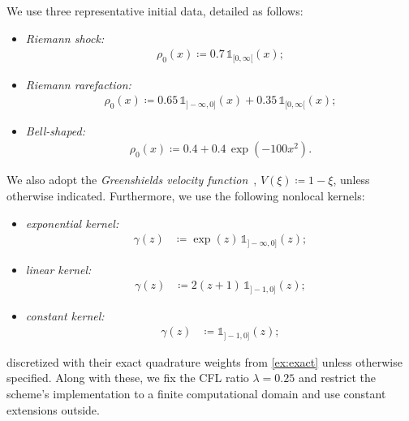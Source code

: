 \documentclass[10pt]{amsart}
\theoremstyle{plain}
\theoremstyle{definition}
\numberwithin{equation}{section}
\begin{document}
We use three representative initial data, detailed as follows:  
\begin{itemize}
    \item \emph{Riemann shock:}
    \begin{align}\label{eq:ini_riemann_shock}
        \rho_0(x) \coloneqq 0.7\,\mathds{1}_{[0,\infty[}(x);
    \end{align}
    \item \emph{Riemann rarefaction:}
    \begin{align}\label{eq:ini_riemann_rarefaction}
        \rho_0(x) \coloneqq 0.65\,\mathds{1}_{]-\infty,0]}(x) + 0.35\,\mathds{1}_{[0,\infty[}(x);
    \end{align}
    \item \emph{Bell-shaped:} 
    \begin{align}\label{eq:ini_bellshape}
	\rho_0(x) \coloneqq 0.4 + 0.4 \, \exp\left(-100x^2\right).
    \end{align}
\end{itemize}
We also adopt the \textit{Greenshields velocity function}~\cite{greenshields1935study}, $V(\xi) \coloneqq 1 -\xi$, unless otherwise indicated.
Furthermore, we use the following nonlocal kernels:
\begin{itemize}
    \item \emph{exponential kernel:} 
    \begin{align}
        \gamma(z) &\coloneqq \displaystyle \exp(z) \, \mathds{1}_{]-\infty,0]}(z);
        \label{eq:gamma-expo} 
    \end{align}
    
    \item \emph{linear kernel:} 
    \begin{align}
        \gamma(z) &\coloneqq \displaystyle 2(z+1) \, \mathds{1}_{]-1,0]}(z);
        \label{eq:gamma-lin} 
    \end{align}
    
    \item \emph{constant kernel:} 
    \begin{align}
        \gamma(z) &\coloneqq \displaystyle \mathds{1}_{]-1,0]}(z);
        \label{eq:gamma-const} 
    \end{align}
\end{itemize}
discretized with their exact quadrature weights from \cref{ex:exact} unless otherwise specified.
Along with these, we fix the CFL ratio $\lambda=0.25$ and restrict the scheme's implementation to a finite computational domain and use constant extensions outside.
\end{document}
